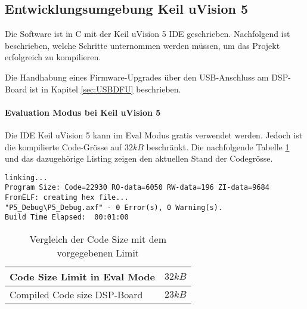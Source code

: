 \subsection{Entwicklungsumgebung Keil uVision 5}
\label{sec:IDE}

Die Software ist in C mit der Keil uVision 5 IDE geschrieben. Nachfolgend ist beschrieben, welche Schritte unternommen werden müssen, um das Projekt erfolgreich zu kompilieren.

Die Handhabung eines Firmware-Upgrades über den USB-Anschluss am DSP-Board ist in Kapitel \ref{sec:USBDFU} beschrieben.


\paragraph{Evaluation Modus bei Keil uVision 5}

Die IDE Keil uVision 5 kann im Eval Modus gratis verwendet werden.
Jedoch ist die kompilierte Code-Grösse auf $32\si{kB}$ beschränkt.
Die nachfolgende Tabelle \ref{tab:codesize} und das dazugehörige Listing zeigen den aktuellen Stand der Codegrösse.

\begin{lstlisting}[caption={Build Output beim Kompilieren der Software}]
linking...
Program Size: Code=22930 RO-data=6050 RW-data=196 ZI-data=9684  
FromELF: creating hex file...
"P5_Debug\P5_Debug.axf" - 0 Error(s), 0 Warning(s).
Build Time Elapsed:  00:01:00
\end{lstlisting}

\begin{table}[H]
	\centering
	\begin{tabular}{|l|l|}
		\hline
		Code Size Limit in Eval Mode & $32\si{kB}$ \\ \hline
		Compiled Code size DSP-Board & $23\si{kB}$ \\ \hline
	\end{tabular}
	\caption{Vergleich der Code Size mit dem vorgegebenen Limit}
	\label{tab:codesize}
\end{table}

